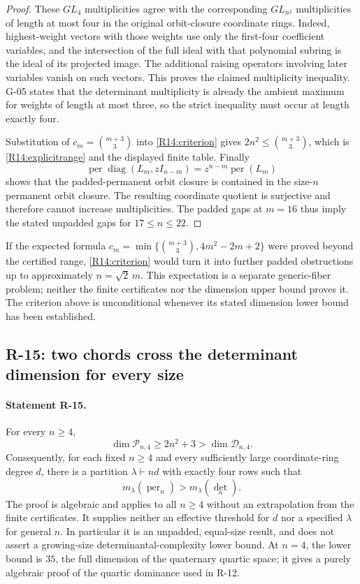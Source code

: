 \begin{proof}
These $GL_4$ multiplicities agree with the corresponding
$GL_{n^2}$ multiplicities of length at most four in the original
orbit-closure coordinate rings. Indeed, highest-weight vectors
with those weights use only the first-four coefficient variables,
and the intersection of the full ideal with that polynomial
subring is the ideal of its projected image. The additional
raising operators involving later variables vanish on such
vectors. This proves the claimed multiplicity inequality.
G-05 states that the determinant multiplicity is already the
ambient maximum for weights of length at most three, so the
strict inequality must occur at length exactly four.

Substitution of $c_m=\binom{m+3}{3}$ into
\eqref{R14:criterion} gives $2n^2\leq\binom{m+3}{3}$, which is
\eqref{R14:explicitrange} and the displayed finite table.
Finally
\[
 \operatorname{per}\operatorname{diag}(L_m,zI_{n-m})
 =z^{n-m}\operatorname{per}(L_m)
\]
shows that the padded-permanent orbit closure is contained in
the size-$n$ permanent orbit closure. The resulting coordinate
quotient is surjective and therefore cannot increase
multiplicities. The padded gaps at $m=16$ thus imply the stated
unpadded gaps for $17\leq n\leq22$.
\end{proof}

If the expected formula
$c_m=\min\{\binom{m+3}{3},4m^2-2m+2\}$ were proved beyond the
certified range, \eqref{R14:criterion} would turn it into further
padded obstructions up to approximately $n=\sqrt2\,m$.
This expectation is a separate generic-fiber problem; neither
the finite certificates nor the dimension upper bound proves it.
The criterion above is unconditional whenever its stated
dimension lower bound has been established.

\subsection{R-15: two chords cross the determinant dimension for every size}

\paragraph{Statement R-15.}
For every $n\geq4$,
\begin{equation}\label{R15:strictdimension}
 \dim\mathcal P_{n,4}\geq2n^2+3
 >\dim\mathcal D_{n,4}.
\end{equation}
Consequently, for each fixed $n\geq4$ and every sufficiently
large coordinate-ring degree $d$, there is a partition
$\lambda\vdash nd$ with exactly four rows such that
\begin{equation}\label{R15:allngap}
 m_\lambda(\operatorname{per}_n)>m_\lambda(\det_n).
\end{equation}
The proof is algebraic and applies to all $n\geq4$ without an
extrapolation from the finite certificates. It supplies neither
an effective threshold for $d$ nor a specified $\lambda$ for
general $n$. In particular it is an unpadded, equal-size result,
and does not assert a growing-size determinantal-complexity lower
bound. At $n=4$, the lower bound is $35$, the full dimension of
the quaternary quartic space; it gives a purely algebraic proof
of the quartic dominance used in R-12.

